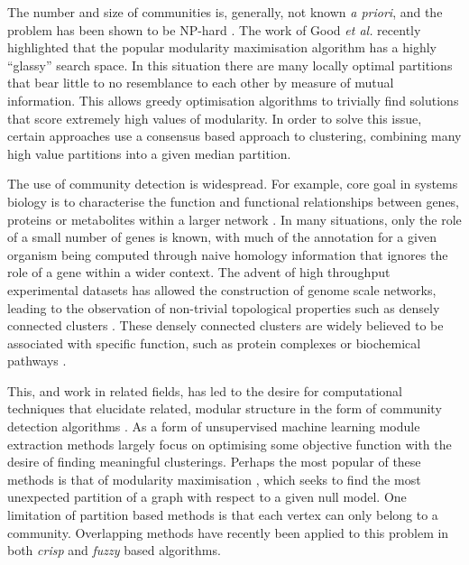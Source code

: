 \documentclass[a4paper,10pt]{article}
\begin{document}
The number and size of communities is, generally, not known \textit{a priori}, and the problem has been shown to be NP-hard \cite{npHardModularity}.
The work of Good \textit{et al.} \cite{good2010performance} recently highlighted that the popular modularity maximisation algorithm has a highly ``glassy'' search space.
In this situation there are many locally optimal partitions that bear little to no resemblance to each other by measure of mutual information.
This allows greedy optimisation algorithms \cite{blondel2008fast} to trivially find solutions that score extremely high values of modularity.
In order to solve this issue, certain approaches use a consensus based approach to clustering, combining many high value partitions into a given median partition.

The use of community detection is widespread.
For example, core goal in systems biology is to characterise the function and functional relationships between genes, proteins or metabolites within a larger network \cite{}.
In many situations, only the role of a small number of genes is known, with much of the annotation for a given organism being computed through naive homology information that ignores the role of a gene within a wider context.
The advent of high throughput experimental datasets has allowed the construction of genome scale networks, leading to the observation of non-trivial topological properties such as densely connected clusters \cite{ArabidopsisConsortium2011}.
These densely connected clusters are widely believed to be associated with specific function, such as protein complexes or biochemical pathways \cite{}.

This, and work in related fields, has led to the desire for computational techniques that elucidate related, modular structure in the form of community detection algorithms \cite{fortunato2010community}.
As a form of unsupervised machine learning module extraction methods largely focus on optimising some objective function with the desire of finding meaningful clusterings.
Perhaps the most popular of these methods is that of modularity maximisation \cite{newman2004}, which seeks to find the most unexpected partition of a graph with respect to a given null model.
One limitation of partition based methods is that each vertex can only belong to a community.
Overlapping methods have recently been applied to this problem in both \textit{crisp} \cite{ahn2010link, lancichinetti2011finding} and \textit{fuzzy} \cite{gregory2011fuzzy} based algorithms.
\end{document}

